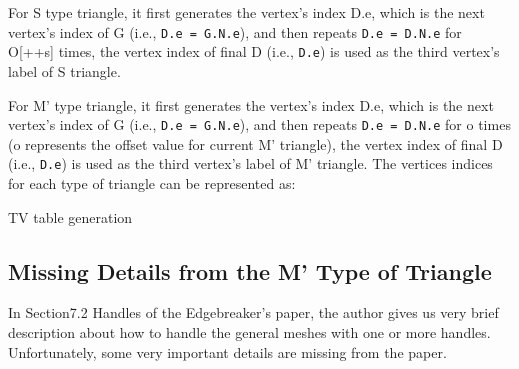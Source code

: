 \documentclass[onecolumn, 12pt]{article}
\begin{document}
{For S type triangle, it first generates the vertex's index D.e, which is the next vertex's index of G (i.e., \lstinline!D.e = G.N.e!), and then repeats \lstinline!D.e = D.N.e! for O[++s] times, the vertex index of final D (i.e., \lstinline!D.e!) is used as the third vertex's label of S triangle.

For M' type triangle, it first generates the vertex's index D.e, which is the next vertex's index of G (i.e., \lstinline!D.e = G.N.e!), and then repeats \lstinline!D.e = D.N.e! for o times (o represents the offset value for current M' triangle), the vertex index of final D (i.e., \lstinline!D.e!) is used as the third vertex's label of M' triangle. The vertices indices for each type of triangle can be represented as:

\begin{algorithm}[H]
\caption{TV table generation}
\begin{algorithmic}[1]
    \ENDFOR
    \ENDFOR
\ENDIF
\end{algorithmic}
\end{algorithm}



\begin{appendices}
\section{Missing Details from the M' Type of Triangle}
In Section7.2 Handles of the Edgebreaker's paper, the author gives us very brief description about how to handle the general meshes with one or more handles. Unfortunately, some very important details are missing from the paper.



\end{appendices}}
\end{document}
